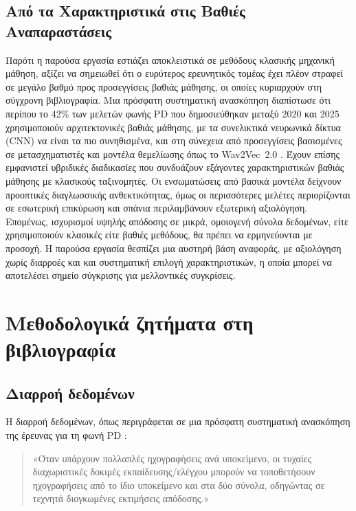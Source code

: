 \subsection{Από τα Χαρακτηριστικά στις Βαθιές Αναπαραστάσεις}
\label{sec:dl-trend}

Παρότι η παρούσα εργασία εστιάζει αποκλειστικά σε μεθόδους κλασικής μηχανική μάθηση, αξίζει να σημειωθεί ότι ο ευρύτερος ερευνητικός τομέας έχει πλέον στραφεί σε μεγάλο βαθμό προς προσεγγίσεις βαθιάς μάθησης, οι οποίες κυριαρχούν στη σύγχρονη βιβλιογραφία. 
Μια πρόσφατη συστηματική ανασκόπηση διαπίστωσε ότι περίπου το 42\% των μελετών φωνής PD που δημοσιεύθηκαν μεταξύ 2020 και 2025 χρησιμοποιούν αρχιτεκτονικές βαθιάς μάθησης, με τα συνελικτικά νευρωνικά δίκτυα (CNN) να είναι τα πιο συνηθισμένα, και στη σύνεχεια από προσεγγίσεις βασισμένες σε μετασχηματιστές και μοντέλα θεμελίωσης όπως το Wav2Vec~2.0 \citep{sedigh_malekroodi2025voice}. 
Έχουν επίσης εμφανιστεί υβριδικές διαδικασίες που συνδυάζουν εξάγοντες χαρακτηριστικών βαθιάς μάθησης με κλασικούς ταξινομητές. 
Οι ενσωματώσεις από βασικά μοντέλα δείχνουν προοπτικές διαγλωσσικής ανθεκτικότητας, 
όμως οι περισσότερες μελέτες περιορίζονται σε εσωτερική επικύρωση και σπάνια περιλαμβάνουν εξωτερική αξιολόγηση. 
Επομένως, ισχυρισμοί υψηλής απόδοσης σε μικρά, ομοιογενή σύνολα δεδομένων, είτε χρησιμοποιούν κλασικές είτε βαθιές μεθόδους, θα πρέπει να ερμηνεύονται με προσοχή. 
Η παρούσα εργασία θεσπίζει μια αυστηρή βάση αναφοράς, με αξιολόγηση χωρίς διαρροές και και συστηματική επιλογή χαρακτηριστικών, η οποία μπορεί να αποτελέσει σημείο σύγκρισης για μελλοντικές συγκρίσεις.

\section{Μεθοδολογικά ζητήματα στη βιβλιογραφία}

\subsection{Διαρροή δεδομένων}

Η διαρροή δεδομένων, όπως περιγράφεται σε μια πρόσφατη συστηματική ανασκόπηση της έρευνας για τη φωνή PD \citep{sedigh_malekroodi2025voice}:

\begin{quote}
«Όταν υπάρχουν πολλαπλές ηχογραφήσεις ανά υποκείμενο, οι τυχαίες διαχωριστικές δοκιμές εκπαίδευσης/ελέγχου μπορούν να τοποθετήσουν ηχογραφήσεις από το ίδιο υποκείμενο και στα δύο σύνολα, οδηγώντας σε τεχνητά διογκωμένες εκτιμήσεις απόδοσης.»
\end{quote}

